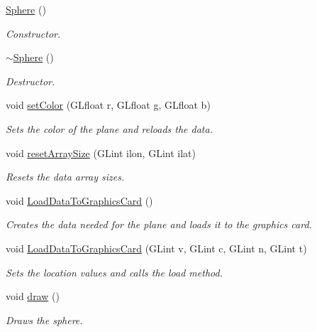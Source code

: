 \begin{DoxyCompactItemize}
\item 
\hyperlink{class_sphere_a890a63ff583cb88e7ec4e840b4ef5eb9}{Sphere} ()
\begin{DoxyCompactList}\small\item\em Constructor. \end{DoxyCompactList}\item 
\hyperlink{class_sphere_a569c071e50a3e11f678630ee1a17737e}{$\sim$\+Sphere} ()
\begin{DoxyCompactList}\small\item\em Destructor. \end{DoxyCompactList}\item 
void \hyperlink{class_sphere_a9166231c6ca8f5b266d8c9546081ee8b}{set\+Color} (G\+Lfloat r, G\+Lfloat g, G\+Lfloat b)
\begin{DoxyCompactList}\small\item\em Sets the color of the plane and reloads the data. \end{DoxyCompactList}\item 
void \hyperlink{class_sphere_a7232eabaf8efe2b0be48988312079e71}{reset\+Array\+Size} (G\+Lint ilon, G\+Lint ilat)
\begin{DoxyCompactList}\small\item\em Resets the data array sizes. \end{DoxyCompactList}\item 
\mbox{\label{class_sphere_a67e0120a932b0caf5c967f24be43b885}} 
void \hyperlink{class_sphere_a67e0120a932b0caf5c967f24be43b885}{Load\+Data\+To\+Graphics\+Card} ()
\begin{DoxyCompactList}\small\item\em Creates the data needed for the plane and loads it to the graphics card. \end{DoxyCompactList}\item 
void \hyperlink{class_sphere_ae7781b43596bd0d45e0effa6c039c8af}{Load\+Data\+To\+Graphics\+Card} (G\+Lint v, G\+Lint c, G\+Lint n, G\+Lint t)
\begin{DoxyCompactList}\small\item\em Sets the location values and calls the load method. \end{DoxyCompactList}\item 
\mbox{\label{class_sphere_a34a34167b7544c95155d3ff30638d045}} 
void \hyperlink{class_sphere_a34a34167b7544c95155d3ff30638d045}{draw} ()
\begin{DoxyCompactList}\small\item\em Draws the sphere. \end{DoxyCompactList}\end{DoxyCompactItemize}


